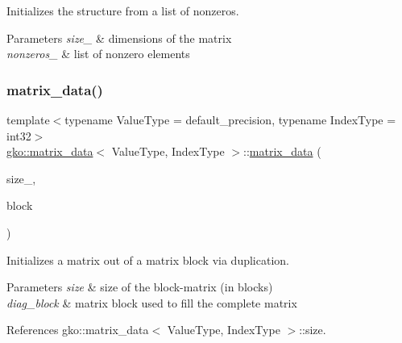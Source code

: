 Initializes the structure from a list of nonzeros. 


\begin{DoxyParams}{Parameters}
{\em size\+\_\+} & dimensions of the matrix \\
\hline
{\em nonzeros\+\_\+} & list of nonzero elements \\
\hline
\end{DoxyParams}
\mbox{\label{structgko_1_1matrix__data_aa8398ce720b3db2ebde137419d032352}} 
\subsubsection{\texorpdfstring{matrix\+\_\+data()}{matrix\_data()}\hspace{0.1cm}{\footnotesize\ttfamily [5/6]}}
{\footnotesize\ttfamily template$<$typename Value\+Type = default\+\_\+precision, typename Index\+Type = int32$>$ \\
\hyperlink{structgko_1_1matrix__data}{gko\+::matrix\+\_\+data}$<$ Value\+Type, Index\+Type $>$\+::\hyperlink{structgko_1_1matrix__data}{matrix\+\_\+data} (\begin{DoxyParamCaption}\item[{\hyperlink{structgko_1_1dim}{dim}$<$ 2 $>$}]{size\+\_\+,  }\item[{const \hyperlink{structgko_1_1matrix__data}{matrix\+\_\+data}$<$ Value\+Type, Index\+Type $>$ \&}]{block }\end{DoxyParamCaption})}



Initializes a matrix out of a matrix block via duplication. 


\begin{DoxyParams}{Parameters}
{\em size} & size of the block-\/matrix (in blocks) \\
\hline
{\em diag\+\_\+block} & matrix block used to fill the complete matrix \\
\hline
\end{DoxyParams}


References gko\+::matrix\+\_\+data$<$ Value\+Type, Index\+Type $>$\+::size.

\mbox{\label{structgko_1_1matrix__data_a380d2b8207621f3c997804afa6d729af}} 
